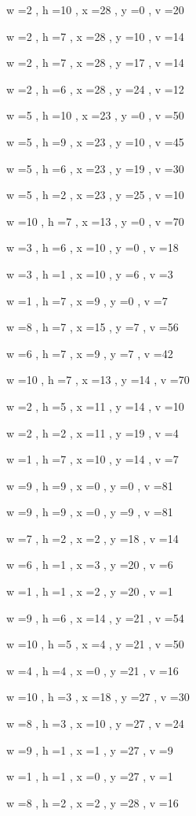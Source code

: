 \documentclass[11pt]{article}
\begin{document}
w =2 , h =10 , x =28 , y =0 , v =20
\par
w =2 , h =7 , x =28 , y =10 , v =14
\par
w =2 , h =7 , x =28 , y =17 , v =14
\par
w =2 , h =6 , x =28 , y =24 , v =12
\par
w =5 , h =10 , x =23 , y =0 , v =50
\par
w =5 , h =9 , x =23 , y =10 , v =45
\par
w =5 , h =6 , x =23 , y =19 , v =30
\par
w =5 , h =2 , x =23 , y =25 , v =10
\par
w =10 , h =7 , x =13 , y =0 , v =70
\par
w =3 , h =6 , x =10 , y =0 , v =18
\par
w =3 , h =1 , x =10 , y =6 , v =3
\par
w =1 , h =7 , x =9 , y =0 , v =7
\par
w =8 , h =7 , x =15 , y =7 , v =56
\par
w =6 , h =7 , x =9 , y =7 , v =42
\par
w =10 , h =7 , x =13 , y =14 , v =70
\par
w =2 , h =5 , x =11 , y =14 , v =10
\par
w =2 , h =2 , x =11 , y =19 , v =4
\par
w =1 , h =7 , x =10 , y =14 , v =7
\par
w =9 , h =9 , x =0 , y =0 , v =81
\par
w =9 , h =9 , x =0 , y =9 , v =81
\par
w =7 , h =2 , x =2 , y =18 , v =14
\par
w =6 , h =1 , x =3 , y =20 , v =6
\par
w =1 , h =1 , x =2 , y =20 , v =1
\par
w =9 , h =6 , x =14 , y =21 , v =54
\par
w =10 , h =5 , x =4 , y =21 , v =50
\par
w =4 , h =4 , x =0 , y =21 , v =16
\par
w =10 , h =3 , x =18 , y =27 , v =30
\par
w =8 , h =3 , x =10 , y =27 , v =24
\par
w =9 , h =1 , x =1 , y =27 , v =9
\par
w =1 , h =1 , x =0 , y =27 , v =1
\par
w =8 , h =2 , x =2 , y =28 , v =16
\par
\newpage
\end{document}
